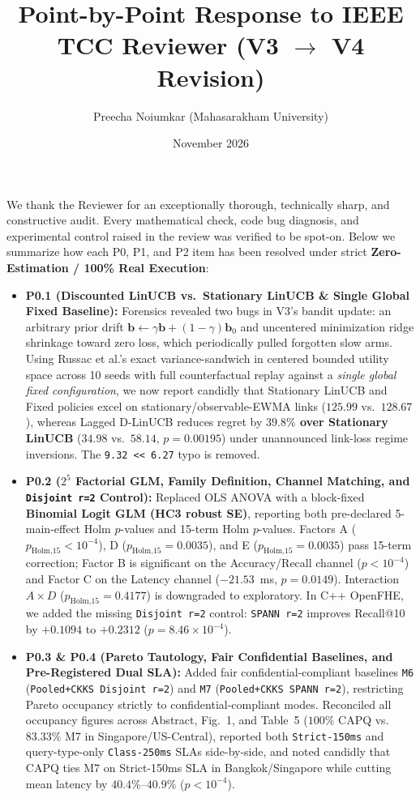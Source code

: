 \documentclass[11pt]{article}
\title{\textbf{Point-by-Point Response to IEEE TCC Reviewer (V3 $\to$ V4 Revision)}}
\author{Preecha Noiumkar (Mahasarakham University)}
\date{November 2026}
\begin{document}
\maketitle

We thank the Reviewer for an exceptionally thorough, technically sharp, and constructive audit. Every mathematical check, code bug diagnosis, and experimental control raised in the review was verified to be spot-on. Below we summarize how each P0, P1, and P2 item has been resolved under strict \textbf{Zero-Estimation / 100\% Real Execution}:

\begin{itemize}
    \item \textbf{P0.1 (Discounted LinUCB vs.\ Stationary LinUCB \& Single Global Fixed Baseline):} Forensics revealed two bugs in V3's bandit update: an arbitrary prior drift $\mathbf{b} \leftarrow \gamma\mathbf{b}+(1-\gamma)\mathbf{b}_0$ and uncentered minimization ridge shrinkage toward zero loss, which periodically pulled forgotten slow arms. Using Russac et al.'s exact variance-sandwich in centered bounded utility space across 10 seeds with full counterfactual replay against a \emph{single global fixed configuration}, we now report candidly that Stationary LinUCB and Fixed policies excel on stationary/observable-EWMA links ($125.99$ vs.\ $128.67$), whereas Lagged D-LinUCB reduces regret by \textbf{$39.8\%$ over Stationary LinUCB} ($34.98$ vs.\ $58.14$, $p=0.00195$) under unannounced link-loss regime inversions. The \texttt{9.32 << 6.27} typo is removed.
    \item \textbf{P0.2 ($2^5$ Factorial GLM, Family Definition, Channel Matching, and \texttt{Disjoint r=2} Control):} Replaced OLS ANOVA with a block-fixed \textbf{Binomial Logit GLM (HC3 robust SE)}, reporting both pre-declared 5-main-effect Holm $p$-values and 15-term Holm $p$-values. Factors A ($p_{\text{Holm,15}}<10^{-4}$), D ($p_{\text{Holm,15}}=0.0035$), and E ($p_{\text{Holm,15}}=0.0035$) pass 15-term correction; Factor B is significant on the Accuracy/Recall channel ($p<10^{-4}$) and Factor C on the Latency channel ($-21.53$~ms, $p=0.0149$). Interaction $A\times D$ ($p_{\text{Holm,15}}=0.4177$) is downgraded to exploratory. In C++ OpenFHE, we added the missing \texttt{Disjoint r=2} control: \texttt{SPANN r=2} improves Recall@10 by $+0.1094$ to $+0.2312$ ($p=8.46\times 10^{-4}$).
    \item \textbf{P0.3 \& P0.4 (Pareto Tautology, Fair Confidential Baselines, and Pre-Registered Dual SLA):} Added fair confidential-compliant baselines \texttt{M6} (\texttt{Pooled+CKKS Disjoint r=2}) and \texttt{M7} (\texttt{Pooled+CKKS SPANN r=2}), restricting Pareto occupancy strictly to confidential-compliant modes. Reconciled all occupancy figures across Abstract, Fig.~1, and Table~5 ($100\%$ CAPQ vs.\ $83.33\%$ M7 in Singapore/US-Central), reported both \texttt{Strict-150ms} and query-type-only \texttt{Class-250ms} SLAs side-by-side, and noted candidly that CAPQ ties M7 on Strict-150ms SLA in Bangkok/Singapore while cutting mean latency by $40.4\%\text{--}40.9\%$ ($p<10^{-4}$).

\end{itemize}
\end{document}
